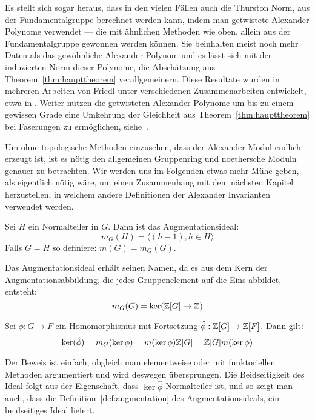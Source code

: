 \begin{bem}
Es stellt sich sogar heraus, dass in den vielen Fällen auch die Thurston Norm, aus der Fundamentalgruppe berechnet werden kann, indem man getwistete Alexander Polynome verwendet --- die mit ähnlichen Methoden wie oben, allein aus der Fundamentalgruppe gewonnen werden können. Sie beinhalten meist noch mehr Daten als das gewöhnliche Alexander Polynom und es lässt sich mit der induzierten Norm dieser Polynome, die Abschätzung aus Theorem~\ref{thm:haupttheorem} verallgemeinern. Diese Resultate wurden in mehreren Arbeiten von Friedl unter verschiedenen Zusammenarbeiten entwickelt, etwa in \cite{Friedl.2011,Friedl.2008,Friedl.2008b,Friedl.2007,Friedl.2006,Friedl.2008c}. Weiter nützen die getwisteten Alexander Polynome um bis zu einem gewissen Grade eine Umkehrung der Gleichheit aus Theorem~\ref{thm:haupttheorem} bei Faserungen zu ermöglichen, siehe~\cite{Friedl.2006,Friedl.2008b}.
\end{bem}

Um ohne topologische Methoden einzusehen, dass der Alexander Modul endlich erzeugt ist, ist es nötig den allgemeinen Gruppenring und noethersche Moduln genauer zu betrachten. Wir werden uns im Folgenden etwas mehr Mühe geben, als eigentlich nötig wäre, um einen Zusammenhang mit dem nächsten Kapitel herzustellen, in welchem andere Definitionen der Alexander Invarianten verwendet werden.

\begin{defn}[Augmentationsideal]
\label{def:augmentation}
	Sei $H$ ein Normalteiler in $G$. Dann ist das Augmentationsideal:
	\[
		m_G(H) = \langle (h-1), h\in H \rangle
	\]
	Falls $G=H$ so definiere: $m(G)=m_G(G)$.
\end{defn}

\begin{bem}
Das Augmentationsideal erhält seinen Namen, da es aus dem Kern der Augmentationsabbildung, die jedes Gruppenelement auf die Eins abbildet, entsteht:
\[
	m_G(G) = \ker(\mathbb{Z}[G] \to \mathbb{Z})
\]

\end{bem}
\begin{lem}
\label{lem:augmker}
	Sei $\phi:G \to F$ ein Homomorphismus mit Fortsetzung $\hat \phi: \mathbb{Z}[G] \to \mathbb{Z}[F]$. Dann gilt:
	\[
		\ker(\hat\phi) = m_G(\ker\phi)= m(\ker\phi) \mathbb{Z}[G] = \mathbb{Z}[G] m(\ker\phi) 
	\]
\end{lem}
Der Beweis ist einfach, obgleich man elementweise oder mit funktoriellen Methoden argumentiert und wird deswegen übersprungen. Die Beidseitigkeit des Ideal folgt aus der Eigenschaft, dass $\ker\hat\phi$ Normalteiler ist, und so zeigt man auch, dass die Definition~\ref{def:augmentation} des Augmentationsideals, ein beidseitiges Ideal liefert.


